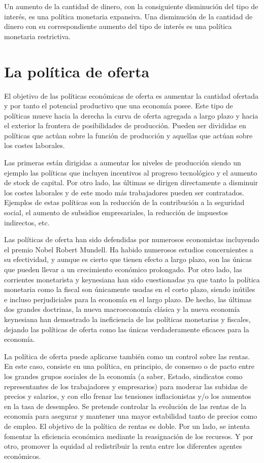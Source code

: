 \documentclass[
]{krantz}
\begin{document}
Un aumento de la cantidad de dinero, con la consiguiente disminución del tipo de interés, es una política monetaria expansiva. Una disminución de la cantidad de dinero con su correspondiente aumento del tipo de interés es una política monetaria restrictiva.

\hypertarget{la-poluxedtica-de-oferta}{%
\section{La política de oferta}\label{la-poluxedtica-de-oferta}}

El objetivo de las políticas económicas de oferta es aumentar la cantidad ofertada y por tanto el potencial productivo que una economía posee. Este tipo de políticas mueve hacia la derecha la curva de oferta agregada a largo plazo y hacia el exterior la frontera de posibilidades de producción. Pueden ser divididas en políticas que actúan sobre la función de producción y aquellas que actúan sobre los costes laborales.

Las primeras están dirigidas a aumentar los niveles de producción siendo un ejemplo las políticas que incluyen incentivos al progreso tecnológico y el aumento de stock de capital. Por otro lado, las últimas se dirigen directamente a disminuir los costes laborales y de este modo más trabajadores pueden ser contratados. Ejemplos de estas políticas son la reducción de la contribución a la seguridad social, el aumento de subsidios empresariales, la reducción de impuestos indirectos, etc.

Las políticas de oferta han sido defendidas por numerosos economistas incluyendo el premio Nobel Robert Mundell. Ha habido numerosos estudios concernientes a su efectividad, y aunque es cierto que tienen efecto a largo plazo, son las únicas que pueden llevar a un crecimiento económico prolongado. Por otro lado, las corrientes monetarista y keynesiana han sido cuestionadas ya que tanto la política monetaria como la fiscal son únicamente usadas en el corto plazo, siendo inútiles e incluso perjudiciales para la economía en el largo plazo. De hecho, las últimas dos grandes doctrinas, la nueva macroeconomía clásica y la nueva economía keynesiana han demostrado la ineficiencia de las políticas monetarias y fiscales, dejando las políticas de oferta como las únicas verdaderamente eficaces para la economía.

La política de oferta puede aplicarse también como un control sobre las rentas. En este caso, consiste en una política, en principio, de consenso o de pacto entre los grandes grupos sociales de la economía (a saber, Estado, sindicatos como representantes de los trabajadores y empresarios) para moderar las subidas de precios y salarios, y con ello frenar las tensiones inflacionistas y/o los aumentos en la tasa de desempleo. Se pretende controlar la evolución de las rentas de la economía para asegurar y mantener una mayor estabilidad tanto de precios como de empleo. El objetivo de la política de rentas es doble. Por un lado, se intenta fomentar la eficiencia económica mediante la reasignación de los recursos. Y por otro, promover la equidad al redistribuir la renta entre los diferentes agentes económicos.
\end{document}
